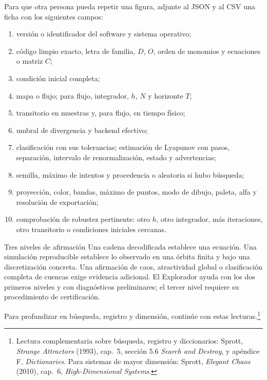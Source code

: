 Para que otra persona pueda repetir una figura, adjunte al JSON y al CSV una ficha
con los siguientes campos:
\begin{enumerate}[label=\arabic*.]
 \item versión o identificador del software y sistema operativo;
 \item código limpio exacto, letra de familia, \(D\), \(O\), orden de monomios y
       ecuaciones o matriz \(C\);
 \item condición inicial completa;
 \item mapa o flujo; para flujo, integrador, \(h\), \(N\) y horizonte \(T\);
 \item transitorio en muestras y, para flujo, en tiempo físico;
 \item umbral de divergencia y backend efectivo;
 \item clasificación con sus tolerancias; estimación de Lyapunov con pasos,
       separación, intervalo de renormalización, estado y advertencias;
 \item semilla, máximo de intentos y procedencia  o aleatoria si
       hubo búsqueda;
 \item proyección, color, bandas, máximo de puntos, modo de dibujo, paleta, alfa
       y resolución de exportación;
 \item comprobación de robustez pertinente: otro \(h\), otro integrador, más
       iteraciones, otro transitorio o condiciones iniciales cercanas.
\end{enumerate}

\begin{idea}{Tres niveles de afirmación}
Una cadena decodificada establece una ecuación. Una simulación reproducible
establece lo observado en una órbita finita y bajo una discretización concreta.
Una afirmación de caos, atractividad global o clasificación completa de cuencas
exige evidencia adicional. El Explorador ayuda con los dos primeros niveles y con
diagnósticos preliminares; el tercer nivel requiere su procedimiento de certificación.
\end{idea}

Para profundizar en búsqueda, registro y dimensión, continúe con estas
lecturas.\footnote{Lectura complementaria sobre búsqueda, registro y diccionarios:
Sprott, \emph{Strange Attractors} (1993), cap.~5, sección 5.6
\emph{Search and Destroy}, y apéndice F, \emph{Dictionaries}. Para sistemas de
mayor dimensión: Sprott, \emph{Elegant Chaos} (2010), cap.~6,
\emph{High-Dimensional Systems}.}
